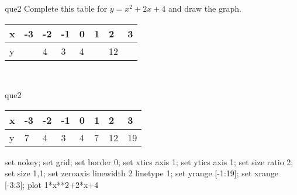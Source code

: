 \documentclass[13.5pt, varwidth=true]{beamer}
\begin{document}
\begin{frame}[shrink=19,fragile]
	\begin{beamercolorbox}[rounded=true, left, shadow=true,wd=14.8cm]{que2}
		 Complete this table for $y = x^{2} + 2x + 4$ and draw the graph. \\[0.3cm] \renewcommand{\arraystretch}{1.2}\begin{tabular}{|C|C|C|C|C|C|C|C|} \hline x & -3 & -2 & -1 & 0 & 1 & 2 & 3 \\ \hline y &  & 4 & 3 & 4 &  & 12 & \\ \hline \end{tabular}\\[0.3cm]
	\end{beamercolorbox}
\end{frame}
\begin{frame}[shrink=19,fragile]
	\begin{beamercolorbox}[rounded=true, left, shadow=true,wd=14.8cm]{que2}
		\renewcommand{\arraystretch}{1.2}\begin{tabular}{|C|C|C|C|C|C|C|C|} \hline x & -3 & -2 & -1 & 0 & 1 & 2 & 3 \\ \hline y & 7 & 4 & 3 & 4 & 7 & 12 & 19\\ \hline \end{tabular}\begin{gnuplot}[terminal=pdf] set nokey; set grid; set border 0; set xtics axis 1; set ytics axis 1; set size ratio 2; set size 1,1; set zeroaxis linewidth 2 linetype 1; set yrange [-1:19]; set xrange [-3:3]; plot 1*x**2+2*x+4 \end{gnuplot}
	\end{beamercolorbox}
\end{frame}
\end{document}
